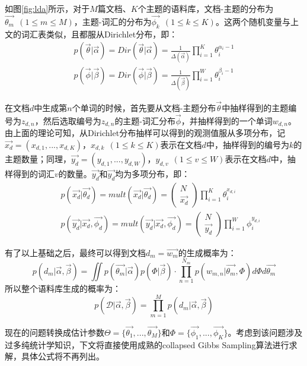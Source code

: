 如图\ref{fig:lda}所示，对于$M$篇文档、$K$个主题的语料库，文档-主题的分布为$\vec{\theta_m}~~(1\le m\le M)$，主题-词汇的分布为$\vec{\phi_k}~~(1\le k\le K)$。这两个随机变量与上文的词汇表类似，且都服从Dirichlet分布，即：
\begin{eqnarray}
  p(\vec{\theta}|\vec{\alpha})=Dir(\vec{\theta}|\vec{\alpha})=\frac{1}{\Delta(\vec{\alpha})}\prod_{i=1}^{K}\theta_{i}^{\alpha_i-1} \\
  p(\vec{\phi}|\vec{\beta})=Dir(\vec{\phi}|\vec{\beta})=\frac{1}{\Delta(\vec{\beta})}\prod_{i=1}^{W}\theta_{i}^{\beta_i-1}
\end{eqnarray}

在文档$d$中生成第$n$个单词的时候，首先要从文档-主题分布$\vec{\theta}$中抽样得到的主题编号为$z_{d,n}$，然后选取编号为$z_{d,n}$的主题-词汇分布$\vec{\phi}$，并抽样得到的一个单词$w_{d,n}$。由上面的理论可知，从Dirichlet分布抽样可以得到的观测值服从多项分布，记$\vec{x_d}=(x_{d,1},...,x_{d,K})$，$x_{d,k}~~(1\le k\le K)$表示在文档$d$中，抽样得到的编号为$k$的主题数量；同理，$\vec{y_d}=(y_{d,1},...,y_{d,W})$，$y_{d,v}~~(1\le v\le W)$表示在文档$d$中，抽样得到的词汇$v$的数量。$\vec{y_d}$和$\vec{y_d}$均为多项分布，即：
\begin{eqnarray}
  &&p(\vec{x_d}|\vec{\theta_d})=mult(\vec{x_d}|\vec{\theta_d})=
  \begin{pmatrix}
    N \\ \vec{x_d}
  \end{pmatrix}
  \prod_{i=1}^{K}\theta_i^{x_{d,i}} \\
  &&p(\vec{y_d}|\vec{x_d},\vec{\phi_d})=mult(\vec{y_d}|\vec{x_d},\vec{\phi_d})=
  \begin{pmatrix}
    N \\ \vec{y_d}
  \end{pmatrix}
  \prod_{i=1}^{W}\phi_i^{y_{d,i}}
\end{eqnarray}

有了以上基础之后，最终可以得到文档$d_m=\vec{w_m}$的生成概率为\cite{heinrich2005parameter}：
\begin{equation}
  p(d_m|\vec{\alpha},\vec{\beta})=\iint p(\vec{\theta_m}|\vec{\alpha})p(\Phi|\vec{\beta})\cdot \prod_{n=1}^{N_m}p(w_{m,n}|\vec{\theta_m},\Phi)d\Phi d\vec{\theta_m}
\end{equation}
所以整个语料库生成的概率为：
\begin{equation}
  p(\mathcal{D}|\vec{\alpha},\vec{\beta})=\prod_{m=1}^{M}p(d_m|\vec{\alpha},\vec{\beta})
\end{equation}

现在的问题转换成估计参数$\Theta=\{\vec{\theta_1},...,\vec{\theta_M}\}$和$\Phi=\{\vec{\phi_1},...,\vec{\phi_K}\}$。考虑到该问题涉及过多纯统计学知识，下文将直接使用成熟的collapsed Gibbs Sampling算法\cite{griffiths2004finding}进行求解，具体公式将不再列出。

